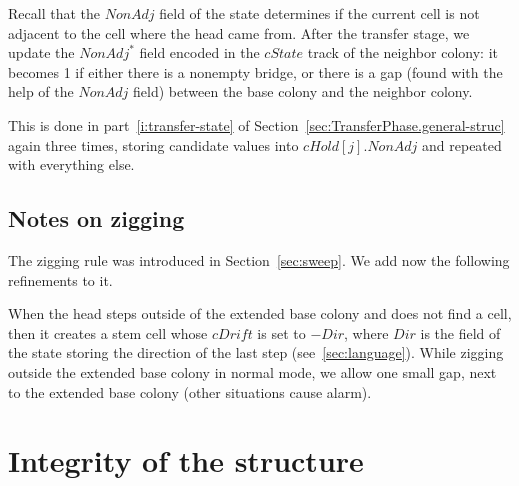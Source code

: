 \documentclass[12pt]{memoir}
\newcommand{\fld}[1]{\ensuremath{\textit{#1}}}
\newcommand{\Z}{Z}
\newcommand{\Dir}{\fld{Dir}}
\newcommand{\cDrift}{\fld{cDrift}}
\newcommand{\NonAdj}{\fld{NonAdj}}
\newcommand{\cHold}{\fld{cHold}}
\newcommand{\cState}{\fld{cState}}
\begin{document}

Recall that the \( \NonAdj \) field of the state determines
if the current cell is not adjacent to the cell  where the head came from.
After the transfer stage, we update the \( \NonAdj^{*} \) field encoded in the
\( \cState \) track of the neighbor colony: it becomes 1 if either there is a nonempty bridge,
or there is a gap (found with the help of the \( \NonAdj \) field) between the base colony
and the neighbor colony.

This is done in part~\ref{i:transfer-state} 
of Section~\ref{sec:TransferPhase.general-struc}
again three times, storing candidate values into \( \cHold[j].\NonAdj \)
and repeated with everything else.

 \subsection{Notes on zigging}\label{sec:zigging}

The zigging rule was introduced in Section~\ref{sec:sweep}.
We add now the following refinements to it.

When the head steps outside of the extended base colony and
does not find a cell, then it creates a stem cell whose
\( \cDrift \) is set to \( -\Dir \), where \( \Dir \) is the field
of the state storing the direction of the last step (see~\ref{sec:language}).
While zigging outside the extended base colony in normal mode,
we allow one small gap, next to the extended base colony
(other situations cause alarm).




\section{Integrity of the structure}            \label{sec:integrity}
\end{document}
